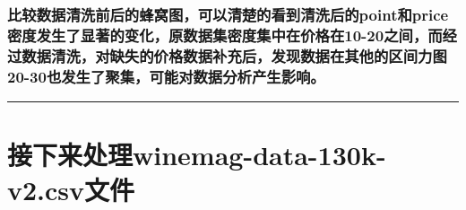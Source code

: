 \documentclass[11pt]{article}
\begin{document}
    \hypertarget{ux6bd4ux8f83ux6570ux636eux6e05ux6d17ux524dux540eux7684ux8702ux7a9dux56feux53efux4ee5ux6e05ux695aux7684ux770bux5230ux6e05ux6d17ux540eux7684pointux548cpriceux5bc6ux5ea6ux53d1ux751fux4e86ux663eux8457ux7684ux53d8ux5316ux539fux6570ux636eux96c6ux5bc6ux5ea6ux96c6ux4e2dux5728ux4ef7ux683cux572810-20ux4e4bux95f4ux800cux7ecfux8fc7ux6570ux636eux6e05ux6d17ux5bf9ux7f3aux5931ux7684ux4ef7ux683cux6570ux636eux8865ux5145ux540eux53d1ux73b0ux6570ux636eux5728ux5176ux4ed6ux7684ux533aux95f4ux529bux56fe20-30ux4e5fux53d1ux751fux4e86ux805aux96c6ux53efux80fdux5bf9ux6570ux636eux5206ux6790ux4ea7ux751fux5f71ux54cd}{%
\subsubsection{比较数据清洗前后的蜂窝图，可以清楚的看到清洗后的point和price密度发生了显著的变化，原数据集密度集中在价格在10-20之间，而经过数据清洗，对缺失的价格数据补充后，发现数据在其他的区间力图20-30也发生了聚集，可能对数据分析产生影响。}\label{ux6bd4ux8f83ux6570ux636eux6e05ux6d17ux524dux540eux7684ux8702ux7a9dux56feux53efux4ee5ux6e05ux695aux7684ux770bux5230ux6e05ux6d17ux540eux7684pointux548cpriceux5bc6ux5ea6ux53d1ux751fux4e86ux663eux8457ux7684ux53d8ux5316ux539fux6570ux636eux96c6ux5bc6ux5ea6ux96c6ux4e2dux5728ux4ef7ux683cux572810-20ux4e4bux95f4ux800cux7ecfux8fc7ux6570ux636eux6e05ux6d17ux5bf9ux7f3aux5931ux7684ux4ef7ux683cux6570ux636eux8865ux5145ux540eux53d1ux73b0ux6570ux636eux5728ux5176ux4ed6ux7684ux533aux95f4ux529bux56fe20-30ux4e5fux53d1ux751fux4e86ux805aux96c6ux53efux80fdux5bf9ux6570ux636eux5206ux6790ux4ea7ux751fux5f71ux54cd}}

    \begin{center}\rule{0.5\linewidth}{0.5pt}\end{center}

\hypertarget{ux63a5ux4e0bux6765ux5904ux7406winemag-data-130k-v2.csvux6587ux4ef6}{%
\section{接下来处理winemag-data-130k-v2.csv文件}\label{ux63a5ux4e0bux6765ux5904ux7406winemag-data-130k-v2.csvux6587ux4ef6}}
\end{document}
